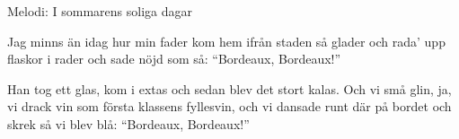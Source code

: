 \begin{song}

\begin{songmeta}
Melodi: I sommarens soliga dagar
\end{songmeta}

\begin{songtext}
Jag minns än idag hur min fader
kom hem ifrån staden så glader
och rada' upp flaskor i rader
och sade nöjd som så:
\textquotedblleft{}Bordeaux, Bordeaux!\textquotedblright{}

Han tog ett glas, kom i extas
och sedan blev det stort kalas.
Och vi små glin, ja, vi drack vin
som första klassens fyllesvin,
och vi dansade runt där på bordet
och skrek så vi blev blå:
\textquotedblleft{}Bordeaux, Bordeaux!\textquotedblright{}
\end{songtext}

\begin{songnotes}
\end{songnotes}

\end{song}
